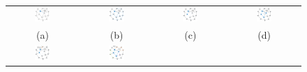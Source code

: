 \begin{figure}
\centering
\begin{tabular}{cccc}
\includegraphics[width=0.23\textwidth]{pictures/seq01.eps} & 
\includegraphics[width=0.23\textwidth]{pictures/seq02.eps} &
\includegraphics[width=0.23\textwidth]{pictures/seq03.eps} & 
\includegraphics[width=0.23\textwidth]{pictures/seq04.eps} \\
(a) & (b) & (c) & (d) \\
\includegraphics[width=0.23\textwidth]{pictures/seq05.eps} &
\includegraphics[width=0.23\textwidth]{pictures/seq06.eps} &

\end{tabular}
\end{figure}
